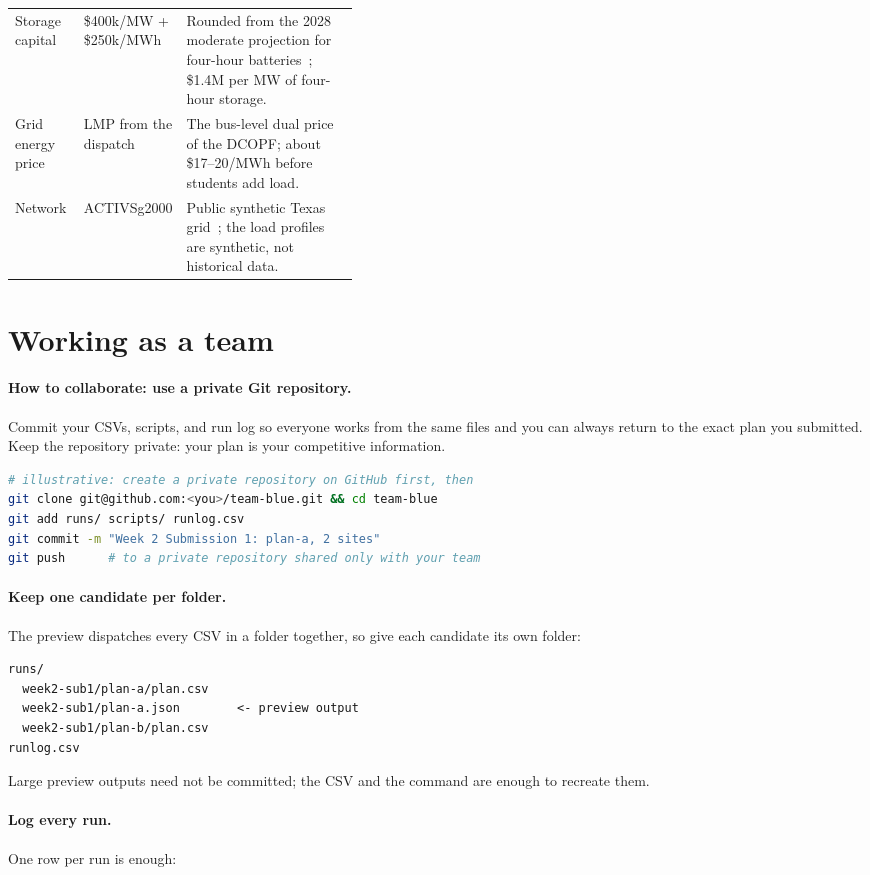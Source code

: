 \documentclass[10pt]{article}
\begin{document}
\begin{center}
\begin{tabularx}{\linewidth}{@{}>{\raggedright\arraybackslash}p{0.2\linewidth} >{\raggedright\arraybackslash}p{0.2\linewidth} X@{}}
Storage capital & \$400k/MW + \$250k/MWh & Rounded from the 2028 moderate projection for four-hour batteries~\cite{nrel2023bess}; \$1.4M per MW of four-hour storage.\\
Grid energy price & LMP from the dispatch & The bus-level dual price of the DCOPF; about \$17--20/MWh before students add load.\\
Network & ACTIVSg2000 & Public synthetic Texas grid~\cite{activsg2000}; the load profiles are synthetic, not historical data.\\
\bottomrule
\end{tabularx}
\end{center}

\section{Working as a team}\label{app:team}

\paragraph{How to collaborate: use a private Git repository.} Commit your CSVs, scripts, and run
log so everyone works from the same files and you can always return to the
exact plan you submitted. Keep the repository private: your plan is your
competitive information.
\begin{lstlisting}[language=bash]
# illustrative: create a private repository on GitHub first, then
git clone git@github.com:<you>/team-blue.git && cd team-blue
git add runs/ scripts/ runlog.csv
git commit -m "Week 2 Submission 1: plan-a, 2 sites"
git push      # to a private repository shared only with your team
\end{lstlisting}

\paragraph{Keep one candidate per folder.} The preview dispatches every CSV
in a folder together, so give each candidate its own folder:
\begin{lstlisting}
runs/
  week2-sub1/plan-a/plan.csv
  week2-sub1/plan-a.json        <- preview output
  week2-sub1/plan-b/plan.csv
runlog.csv
\end{lstlisting}
Large preview outputs need not be committed; the CSV and the command are enough
to recreate them.

\paragraph{Log every run.} One row per run is enough:
\end{document}
